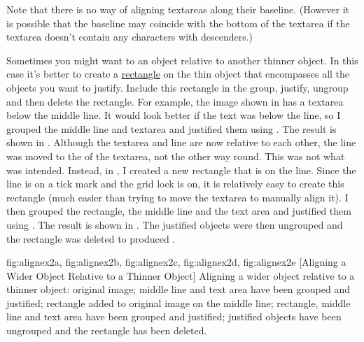 \begin{information}
Note that there is no way of aligning \glspl{textarea} along their
baseline. (However it is possible that the baseline may coincide
with the bottom of the \gls*{textarea} if the \gls*{textarea} doesn't contain
any characters with descenders.)
\end{information}

 Sometimes you might want to  an
\gls{object} relative to another thinner object. In this case it's
better to create a \hyperref[sec:rectangles]{rectangle}
 on the thin object that encompasses all the objects
you want to justify.  Include this rectangle in the \gls{group},
justify, ungroup and then delete the rectangle. For example, the
image shown in  has a \gls{textarea} below
the middle line. It would look better if the text was
 below the line, so I grouped the middle line and
\gls{textarea} and justified them using
. The result is shown in
. Although the \gls{textarea} and line are
now  relative to each other, the line was moved to
the  of the \gls{textarea}, not the other way round.
This was not what was intended. Instead, in
, I created a new rectangle that is
 on the line. Since the line is on a tick mark and
the grid lock is on, it is relatively easy to create this rectangle
(much easier than trying to move the \gls{textarea} to manually
align it). I then grouped the rectangle, the middle line and the
text area and justified them using .
The result is shown in . The justified
objects were then ungrouped and the rectangle was deleted to
produced .

{
  {fig:alignex2a}{}{},
  {fig:alignex2b}{}{},
  {fig:alignex2c}{}{},
  {fig:alignex2d}{}{},
  {fig:alignex2e}{}{}
}
[Aligning a Wider Object Relative to a Thinner Object]
{Aligning a wider object relative to a thinner object:
 original image;
 middle line and text area have
been grouped and justified;
 rectangle added to original
image  on the middle line;
 rectangle, middle line
and text area have been grouped and justified;
 justified
objects have been ungrouped and the rectangle has been deleted.}

